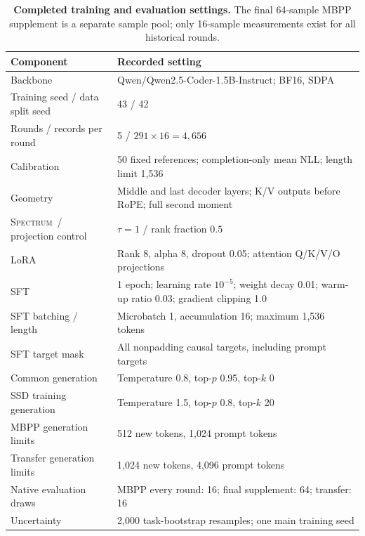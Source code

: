 \documentclass{article}
\newcommand{\method}{\textsc{Spectrum}}
\begin{document}
\begin{table}[t]
\centering\small
\caption{\textbf{Completed training and evaluation settings.} The final 64-sample MBPP supplement is a separate sample pool; only 16-sample measurements exist for all historical rounds.}
\label{tab:settings}
\begin{tabular}{p{.42\linewidth}p{.51\linewidth}}
\toprule
Component & Recorded setting\\
\midrule
Backbone & Qwen/Qwen2.5-Coder-1.5B-Instruct; BF16, SDPA\\
Training seed / data split seed & 43 / 42\\
Rounds / records per round & 5 / $291\times16=4,656$\\
Calibration & 50 fixed references; completion-only mean NLL; length limit 1,536\\
Geometry & Middle and last decoder layers; K/V outputs before RoPE; full second moment\\
\method\ / projection control & $\tau=1$ / rank fraction $0.5$\\
LoRA & Rank 8, alpha 8, dropout 0.05; attention Q/K/V/O projections\\
SFT & 1 epoch; learning rate $10^{-5}$; weight decay 0.01; warm-up ratio 0.03; gradient clipping 1.0\\
SFT batching / length & Microbatch 1, accumulation 16; maximum 1,536 tokens\\
SFT target mask & All nonpadding causal targets, including prompt targets\\
Common generation & Temperature 0.8, top-$p$ 0.95, top-$k$ 0\\
SSD training generation & Temperature 1.5, top-$p$ 0.8, top-$k$ 20\\
MBPP generation limits & 512 new tokens, 1,024 prompt tokens\\
Transfer generation limits & 1,024 new tokens, 4,096 prompt tokens\\
Native evaluation draws & MBPP every round: 16; final supplement: 64; transfer: 16\\
Uncertainty & 2,000 task-bootstrap resamples; one main training seed\\
\bottomrule
\end{tabular}
\end{table}
\end{document}
